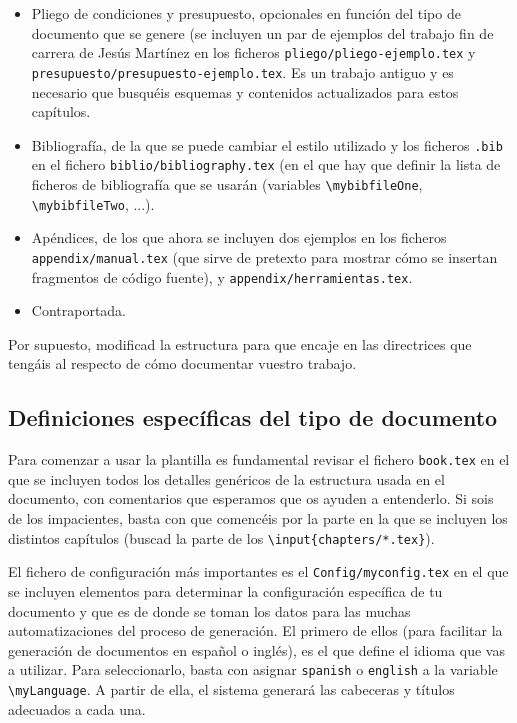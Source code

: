 \begin{itemize}
  \item Pliego de condiciones y presupuesto, opcionales en función del tipo de documento que se genere (se incluyen un par de ejemplos del trabajo fin de carrera de Jesús Martínez en los ficheros \texttt{pliego/pliego-ejemplo.tex} y \texttt{presupuesto/presupuesto-ejemplo.tex}. Es un trabajo antiguo y es necesario que busquéis esquemas y contenidos actualizados para estos capítulos.

  \item Bibliografía, de la que se puede cambiar el estilo utilizado y los ficheros \texttt{.bib} en el fichero \texttt{biblio/bibliography.tex} (en el que hay que definir la lista de ficheros de bibliografía que se usarán (variables \texttt{\textbackslash{}mybibfileOne}, \texttt{\textbackslash{}mybibfileTwo}, ...).

  \item Apéndices, de los que ahora se incluyen dos ejemplos en los ficheros \texttt{appendix/manual.tex} (que sirve de pretexto para mostrar cómo se insertan fragmentos de código fuente), y \texttt{appendix/herramientas.tex}.
  \item Contraportada.
\end{itemize}

Por supuesto, modificad la estructura para que encaje en las directrices que tengáis al respecto de cómo documentar vuestro trabajo.


\subsection{Definiciones específicas del tipo de documento}
\label{sec:definicion-del-tipo}

Para comenzar a usar la plantilla es fundamental revisar el fichero \texttt{book.tex} en el que se incluyen todos los detalles genéricos de la estructura usada en el documento, con comentarios que esperamos que os ayuden a entenderlo. Si sois de los impacientes, basta con que comencéis por la parte en la que se incluyen los distintos capítulos (buscad la parte de los \texttt{\textbackslash{}input\{chapters/*.tex\}}).

El fichero de configuración más importantes es el \texttt{Config/myconfig.tex} en el que se incluyen elementos para determinar la configuración específica de tu documento y que es de donde se toman los datos para las muchas automatizaciones del proceso de generación. El primero de ellos (para facilitar la generación de documentos en español o inglés), es el que define el idioma que vas a utilizar. Para seleccionarlo, basta con asignar \texttt{spanish} o \texttt{english} a la variable \texttt{\textbackslash{}myLanguage}. A partir de ella, el sistema generará las cabeceras y títulos adecuados a cada una.

